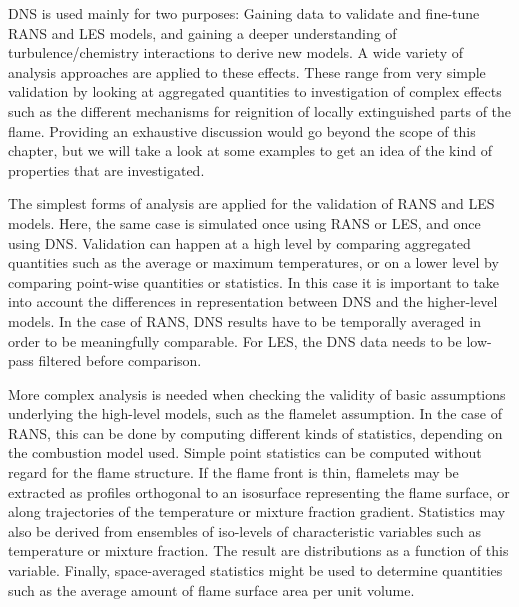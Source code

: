 %
\ac{DNS} is used mainly for two purposes:
%
Gaining data to validate and fine-tune \ac{RANS} and \ac{LES} models, and
gaining a deeper understanding of turbulence/chemistry interactions to derive
new models.
%
A wide variety of analysis approaches are applied to these effects.
%
These range from very simple validation by looking at aggregated quantities to
investigation of complex effects such as the different mechanisms for reignition
of locally extinguished parts of the flame.
%
Providing an exhaustive discussion would go beyond the scope of this chapter,
but we will take a look at some examples to get an idea of the kind of
properties that are investigated.
%

%
The simplest forms of analysis are applied for the validation of \ac{RANS} and
\ac{LES} models.
%
Here, the same case is simulated once using \ac{RANS} or \ac{LES}, and once
using \ac{DNS}.
%
Validation can happen at a high level by comparing aggregated quantities such as
the average or maximum temperatures, or on a lower level by comparing point-wise
quantities or statistics.
%
In this case it is important to take into account the differences in
representation between \ac{DNS} and the higher-level models.
%
In the case of \ac{RANS}, \ac{DNS} results have to be temporally averaged in
order to be meaningfully comparable.
%
For \ac{LES}, the \ac{DNS} data needs to be low-pass filtered before comparison.
%

%
More complex analysis is needed when checking the validity of basic assumptions
underlying the high-level models, such as the flamelet assumption.
%
In the case of \ac{RANS}, this can be done by computing different kinds of
statistics, depending on the combustion model used.
%
Simple point statistics can be computed without regard for the flame structure.
%
If the flame front is thin, flamelets may be extracted as profiles orthogonal
to an isosurface representing the flame surface, or along trajectories of the
temperature or mixture fraction gradient.
%
Statistics may also be derived from ensembles of iso-levels of characteristic
variables such as temperature or mixture fraction.
%
The result are distributions as a function of this variable.
%
Finally, space-averaged statistics might be used to determine quantities such as
the average amount of flame surface area per unit volume.
%


